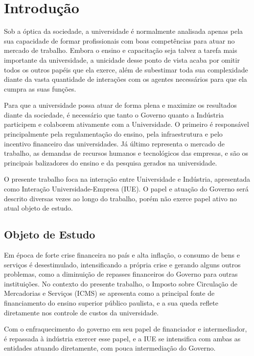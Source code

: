 \chapter[Introdução]{Introdução}
\label{chap:introducao}

Sob a óptica da sociedade, a universidade é normalmente analisada apenas pela sua capacidade de formar profissionais com boas competências para atuar no mercado de trabalho. Embora o ensino e capacitação seja talvez a tarefa mais importante da universidade, a unicidade desse ponto de vista acaba por omitir todos os outros papéis que ela exerce, além de subestimar toda sua complexidade diante da vasta quantidade de interações com os agentes necessários para que ela cumpra as suas funções.

Para que a universidade possa atuar de forma plena e maximize os resultados diante da sociedade, é necessário que tanto o Governo quanto a Indústria participem e colaborem ativamente com a Universidade. O primeiro é responsável principalmente pela regulamentação do ensino, pela infraestrutura e pelo incentivo financeiro das universidades. Já último representa o mercado de trabalho, as demandas de recursos humanos e tecnológicos das empresas, e são os principais balizadores do ensino e da pesquisa gerados na universidade.

O presente trabalho foca na interação entre Universidade e Indústria, apresentada como Interação Universidade-Empresa (IUE). O papel e atuação do Governo será descrito diversas vezes ao longo do trabalho, porém não exerce papel ativo no atual objeto de estudo.

\section{Objeto de Estudo}

Em época de forte crise financeira no país e alta inflação, o consumo de bens e serviços é desestimulado, intensificando a própria crise e gerando alguns outros problemas, como a diminuição de repasses financeiros do Governo para outras instituições. No contexto do presente trabalho, o Imposto sobre Circulação de Mercadorias e Serviços (ICMS) se apresenta como a  principal fonte de financiamento do ensino superior público paulista, e a sua queda reflete diretamente nos controle de custos da universidade.

Com o enfraquecimento do governo em seu papel de financiador e intermediador, é repassada à indústria exercer esse papel, e a IUE se intensifica com ambas as entidades atuando diretamente, com pouca intermediação do Governo.

